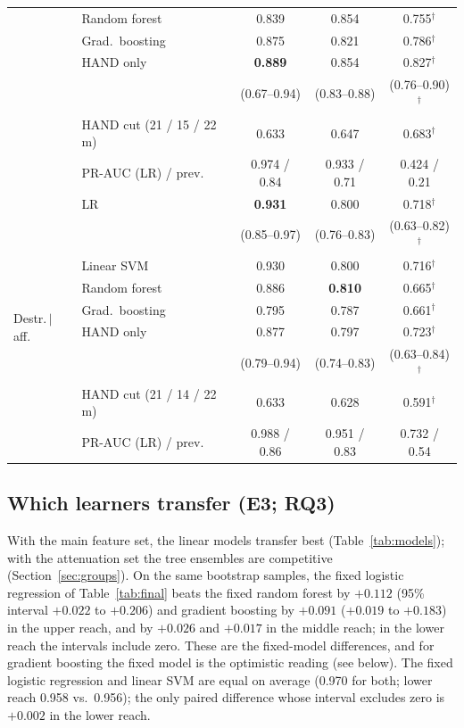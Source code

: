 \documentclass[journal,a4paper]{IEEEtran}
\begin{document}
\begin{table}[t]
\begin{tabular}{@{}llccc@{}}
 & Random forest & 0.839 & 0.854 & 0.755$^\dagger$\\
 & Grad.\ boosting & 0.875 & 0.821 & 0.786$^\dagger$\\
 & HAND only & \textbf{0.889} & 0.854 & 0.827$^\dagger$\\
 & & {\scriptsize(0.67--0.94)} & {\scriptsize(0.83--0.88)} & {\scriptsize(0.76--0.90)}$^\dagger$\\
 & HAND cut (21 / 15 / 22\,m) & 0.633 & 0.647 & 0.683$^\dagger$\\
 & PR-AUC (LR) / prev.\ & 0.974 / 0.84 & 0.933 / 0.71 & 0.424 / 0.21\\
\midrule
\multirow{9}{*}{Destr.\,$\mid$\,aff.} & LR & \textbf{0.931} & 0.800 & 0.718$^\dagger$\\
 & & {\scriptsize(0.85--0.97)} & {\scriptsize(0.76--0.83)} & {\scriptsize(0.63--0.82)}$^\dagger$\\
 & Linear SVM & 0.930 & 0.800 & 0.716$^\dagger$\\
 & Random forest & 0.886 & \textbf{0.810} & 0.665$^\dagger$\\
 & Grad.\ boosting & 0.795 & 0.787 & 0.661$^\dagger$\\
 & HAND only & 0.877 & 0.797 & 0.723$^\dagger$\\
 & & {\scriptsize(0.79--0.94)} & {\scriptsize(0.74--0.83)} & {\scriptsize(0.63--0.84)}$^\dagger$\\
 & HAND cut (21 / 14 / 22\,m) & 0.633 & 0.628 & 0.591$^\dagger$\\
 & PR-AUC (LR) / prev.\ & 0.988 / 0.86 & 0.951 / 0.83 & 0.732 / 0.54\\
\bottomrule
\end{tabular}
\end{table}

\subsection{Which learners transfer (E3; RQ3)}\label{sec:models}
With the main feature set, the linear models transfer best (Table~\ref{tab:models}); with the attenuation set the tree ensembles are competitive (Section~\ref{sec:groups}). On the same bootstrap samples, the fixed logistic regression of Table~\ref{tab:final} beats the fixed random forest by $+0.112$ (95\% interval $+0.022$ to $+0.206$) and gradient boosting by $+0.091$ ($+0.019$ to $+0.183$) in the upper reach, and by $+0.026$ and $+0.017$ in the middle reach; in the lower reach the intervals include zero. These are the fixed-model differences, and for gradient boosting the fixed model is the optimistic reading (see below). The fixed logistic regression and linear SVM are equal on average (0.970 for both; lower reach 0.958 vs.\ 0.956); the only paired difference whose interval excludes zero is $+0.002$ in the lower reach.
\end{document}
